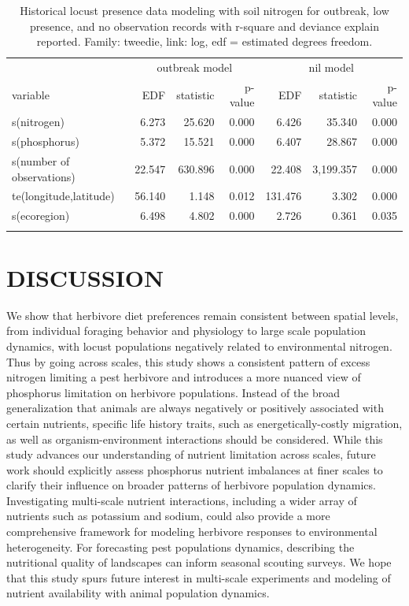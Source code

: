 \documentclass[
]{article}
\begin{document}
\begingroup
\fontsize{12.0pt}{14.4pt}\selectfont

\begin{longtable}{lrrrrrr}

\toprule
 & \multicolumn{3}{c}{outbreak model} & \multicolumn{3}{c}{nil model} \\ 
\cmidrule(lr){2-4} \cmidrule(lr){5-7}
variable & EDF & statistic & p-value & EDF & statistic & p-value \\ 
\midrule\addlinespace[2.5pt]
s(nitrogen) & 6.273 & 25.620 & 0.000 & 6.426 & 35.340 & 0.000 \\ 
s(phosphorus) & 5.372 & 15.521 & 0.000 & 6.407 & 28.867 & 0.000 \\ 
s(number of observations) & 22.547 & 630.896 & 0.000 & 22.408 & 3,199.357 & 0.000 \\ 
te(longitude,latitude) & 56.140 & 1.148 & 0.012 & 131.476 & 3.302 & 0.000 \\ 
s(ecoregion) & 6.498 & 4.802 & 0.000 & 2.726 & 0.361 & 0.035 \\ 
\bottomrule

\caption{\label{tbl-spatial-modeling-outbreak-model-results}Historical
locust presence data modeling with soil nitrogen for outbreak, low
presence, and no observation records with r-square and deviance explain
reported. Family: tweedie, link: log, edf = estimated degrees freedom.}

\tabularnewline

\end{longtable}

\endgroup

\section{DISCUSSION}\label{discussion}

We show that herbivore diet preferences remain consistent between
spatial levels, from individual foraging behavior and physiology to
large scale population dynamics, with locust populations negatively
related to environmental nitrogen. Thus by going across scales, this
study shows a consistent pattern of excess nitrogen limiting a pest
herbivore and introduces a more nuanced view of phosphorus limitation on
herbivore populations. Instead of the broad generalization that animals
are always negatively or positively associated with certain nutrients,
specific life history traits, such as energetically-costly migration, as
well as organism-environment interactions should be considered. While
this study advances our understanding of nutrient limitation across
scales, future work should explicitly assess phosphorus nutrient
imbalances at finer scales to clarify their influence on broader
patterns of herbivore population dynamics. Investigating multi-scale
nutrient interactions, including a wider array of nutrients such as
potassium and sodium, could also provide a more comprehensive framework
for modeling herbivore responses to environmental heterogeneity. For
forecasting pest populations dynamics, describing the nutritional
quality of landscapes can inform seasonal scouting surveys. We hope that
this study spurs future interest in multi-scale experiments and modeling
of nutrient availability with animal population dynamics.
\end{document}
